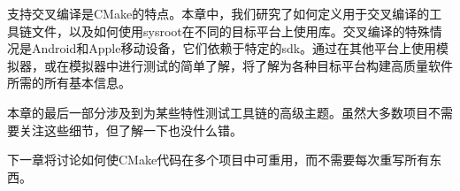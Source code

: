 支持交叉编译是CMake的特点。本章中，我们研究了如何定义用于交叉编译的工具链文件，以及如何使用sysroot在不同的目标平台上使用库。交叉编译的特殊情况是Android和Apple移动设备，它们依赖于特定的sdk。通过在其他平台上使用模拟器，或在模拟器中进行测试的简单了解，将了解为各种目标平台构建高质量软件所需的所有基本信息。

本章的最后一部分涉及到为某些特性测试工具链的高级主题。虽然大多数项目不需要关注这些细节，但了解一下也没什么错。

下一章将讨论如何使CMake代码在多个项目中可重用，而不需要每次重写所有东西。